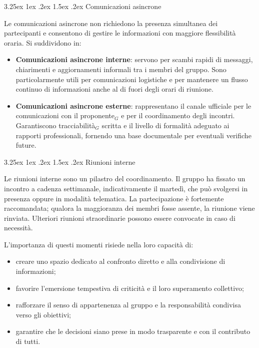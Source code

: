 \documentclass[a4paper, 10pt]{article}
\makeatletter
\renewcommand\paragraph{\@startsection{paragraph}{4}{\z@}%
  {3.25ex \@plus1ex \@minus .2ex}%
  {1.5ex \@plus .2ex}%
  {\normalfont\normalsize\bfseries}}
\makeatother
\begin{document}
\paragraph{Comunicazioni asincrone}

Le comunicazioni asincrone non richiedono la presenza simultanea dei partecipanti e consentono di gestire le informazioni con maggiore flessibilità oraria. Si suddividono in:
\begin{itemize}
    \item \textbf{Comunicazioni asincrone interne}: servono per scambi rapidi di messaggi, chiarimenti e aggiornamenti informali tra i membri del gruppo. Sono particolarmente utili per comunicazioni logistiche e per mantenere un flusso continuo di informazioni anche al di fuori degli orari di riunione.
    \item \textbf{Comunicazioni asincrone esterne}: rappresentano il canale ufficiale per le comunicazioni con il proponente$_G$ e per il coordinamento degli incontri. Garantiscono tracciabilità$_G$ scritta e il livello di formalità adeguato ai rapporti professionali, fornendo una base documentale per eventuali verifiche future.
\end{itemize}

\paragraph{Riunioni interne}

Le riunioni interne sono un pilastro del coordinamento. Il gruppo ha fissato un incontro a cadenza settimanale, indicativamente il martedì, che può svolgersi in presenza oppure in modalità telematica. La partecipazione è fortemente raccomandata; qualora la maggioranza dei membri fosse assente, la riunione viene rinviata. Ulteriori riunioni straordinarie possono essere convocate in caso di necessità.

L'importanza di questi momenti risiede nella loro capacità di:
\begin{itemize}
    \item creare uno spazio dedicato al confronto diretto e alla condivisione di informazioni;
    \item favorire l'emersione tempestiva di criticità e il loro superamento collettivo;
    \item rafforzare il senso di appartenenza al gruppo e la responsabilità condivisa verso gli obiettivi;
    \item garantire che le decisioni siano prese in modo trasparente e con il contributo di tutti.
\end{itemize}
\end{document}
